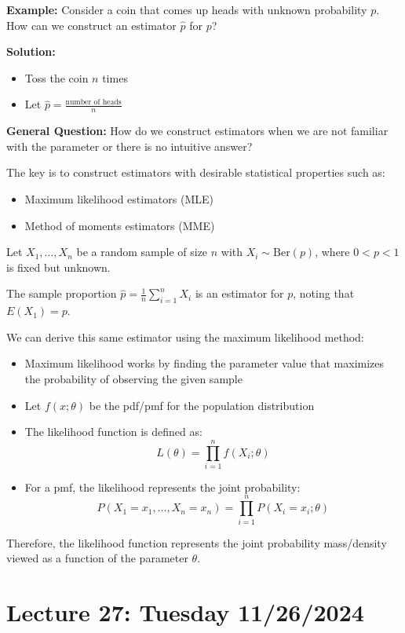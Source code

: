\documentclass{article}
\begin{document}
   \textbf{Example:} Consider a coin that comes up heads with unknown probability $p$. How can we construct an estimator $\hat{p}$ for $p$?

   \textbf{Solution:} 
   \begin{itemize}
       \item Toss the coin $n$ times
       \item Let $\hat{p} = \frac{\text{number of heads}}{n}$
   \end{itemize}
   \textbf{General Question:} How do we construct estimators when we are not familiar with the parameter or there is no intuitive answer?
   
   The key is to construct estimators with desirable statistical properties such as:
   \begin{itemize}
       \item Maximum likelihood estimators (MLE)
       \item Method of moments estimators (MME)
   \end{itemize}

   Let $X_1, \ldots, X_n$ be a random sample of size $n$ with $X_i \sim \text{Ber}(p)$,
   where $0 < p < 1$ is fixed but unknown.

   The sample proportion $\hat{p} = \frac{1}{n}\sum_{i=1}^n X_i$ is an estimator for $p$, noting that $E(X_1) = p$.

   We can derive this same estimator using the maximum likelihood method:
   
   \begin{itemize}
       \item Maximum likelihood works by finding the parameter value that maximizes the probability of observing the given sample
       \item Let $f(x;\theta)$ be the pdf/pmf for the population distribution
       \item The likelihood function is defined as:
             \[L(\theta) = \prod_{i=1}^n f(X_i; \theta)\]
       \item For a pmf, the likelihood represents the joint probability:
             \[P(X_1 = x_1, \ldots, X_n = x_n) = \prod_{i=1}^n P(X_i = x_i; \theta)\]
   \end{itemize}

   Therefore, the likelihood function represents the joint probability mass/density viewed as a function of the parameter $\theta$.


    \section*{Lecture 27: Tuesday 11/26/2024}
\end{document}
